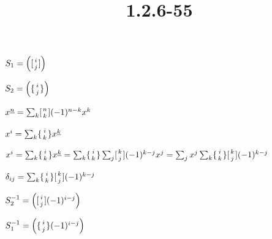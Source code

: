 \documentclass{article}
\title{1.2.6-55}
\begin{document}
\maketitle

$S_1 = \left([{i \atop j}]\right)$

$S_2 = \left(\{{i \atop j}\}\right)$

$x^{\underline{n}} = \sum_k [{n \atop k}](-1)^{n-k}x^k$

$x^{i} = \sum_k \{{i \atop k}\}x^{\underline{k}}$

$x^{i} = \sum_k \{{i \atop k}\}x^{\underline{k}} = \sum_k \{{i \atop k}\}\sum_j [{k \atop j}](-1)^{k-j}x^j = \sum_j x^j \sum_k \{{i \atop k}\}[{k \atop j}](-1)^{k-j}$

$\delta_{ij} = \sum_k \{{i \atop k}\}[{k \atop j}](-1)^{k-j}$

$S_2^{-1} = \left([{i \atop j}](-1)^{i-j}\right)$

$S_1^{-1} = \left(\{{i \atop j}\}(-1)^{i-j}\right)$
\end{document}
